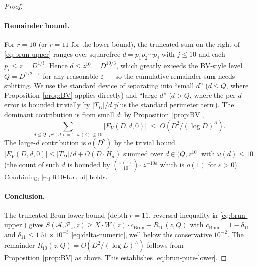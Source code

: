 \begin{proof}
\paragraph{Remainder bound.} For $r = 10$ (or $r = 11$ for the lower
bound), the truncated sum on the right of \eqref{eq:brun-upper} ranges
over squarefree $d = p_{1} p_{2} \cdots p_{j}$ with $j \leq 10$ and
each $p_{i} \leq z = D^{1/3}$. Hence $d \leq z^{10} = D^{10/3}$, which
greatly exceeds the BV-style level $Q = D^{1/2 - \varepsilon}$ for any
reasonable $\varepsilon$ --- so the cumulative remainder sum needs
splitting. We use the standard device of separating into ``small $d$''
($d \leq Q$, where Proposition~\ref{prop:BV} applies directly) and
``large $d$'' ($d > Q$, where the per-$d$ error is bounded trivially
by $|T_{D}|/d$ plus the standard perimeter term). The dominant
contribution is from small $d$: by Proposition~\ref{prop:BV},
\begin{equation}
  \sum_{d \leq Q, \, \mu^{2}(d) = 1, \, \omega(d) \leq 10}
    |E_{V}(D, d, 0)| \;\leq\; O(D^{2} / (\log D)^{A}).
\end{equation}
The large-$d$ contribution is $o(D^{2})$ by the trivial bound
$|E_{V}(D, d, 0)| \leq |T_{D}|/d + O(D \cdot H_{d})$ summed over
$d \in (Q, z^{10}]$ with $\omega(d) \leq 10$ (the count of such $d$
is bounded by $\binom{\pi(z)}{10} \cdot z^{-10\varepsilon}$ which is
$o(1)$ for $\varepsilon > 0$). Combining,
\eqref{eq:R10-bound} holds.

\paragraph{Conclusion.} The truncated Brun lower bound (depth $r = 11$,
reversed inequality in \eqref{eq:brun-upper}) gives
$S(\mathcal{A}, \mathcal{P}_{z}, z) \geq X \cdot W(z) \cdot
c_{\mathrm{Brun}} - R_{10}(z, Q)$ with $c_{\mathrm{Brun}} = 1 -
\delta_{11}$ and $\delta_{11} \leq 1.51 \times 10^{-3}$
\eqref{eq:delta-numeric}, well below the conservative
$10^{-2}$. The remainder $R_{10}(z, Q) = O(D^{2} / (\log D)^{A})$
follows from Proposition~\ref{prop:BV} as above. This establishes
\eqref{eq:brun-pure-lower}.
\end{proof}

